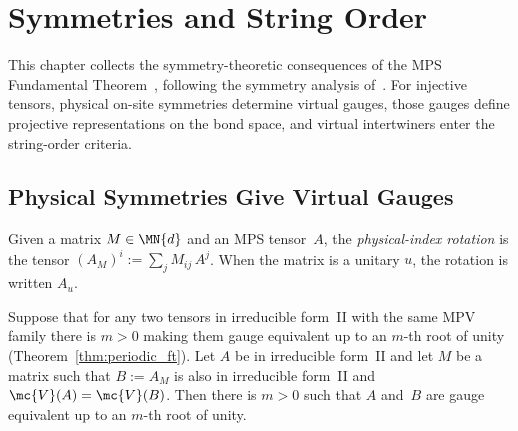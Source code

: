 
\chapter{Symmetries and String Order}\label{ch:symmetry}

This chapter collects the symmetry-theoretic consequences of the MPS
Fundamental Theorem~\cite{PerezGarcia2007Matrix}, following the symmetry
analysis of~\cite{PerezGarcia2008StringOrder}. For injective tensors,
physical on-site symmetries determine virtual gauges, those gauges define
projective representations on the bond space, and virtual intertwiners
enter the string-order criteria.

\section{Physical Symmetries Give Virtual Gauges}

\begin{definition}%
    \label{def:rotate_physical}
    \leanok
    Given a matrix $M \in \MN{d}$ and an MPS tensor~$A$,
    the \emph{physical-index rotation} is the tensor
    $(A_M)^i := \sum_j M_{ij}\, A^j$.
    When the matrix is a unitary $u$, the rotation is written $A_u$.
\end{definition}

\begin{corollary}%
    \label{cor:symmetry_periodic_assembly}
    \leanok
    Suppose that for any two tensors in irreducible form~II with the same MPV
    family there is $m > 0$ making them gauge equivalent up to an $m$-th root of
    unity (Theorem~\ref{thm:periodic_ft}). Let $A$ be in irreducible form~II and
    let $M$ be a matrix such that $B := A_M$ is also in irreducible form~II and
    $\mc{V}(A) = \mc{V}(B)$. Then there is $m > 0$ such that $A$ and~$B$ are
    gauge equivalent up to an $m$-th root of unity.
\end{corollary}

